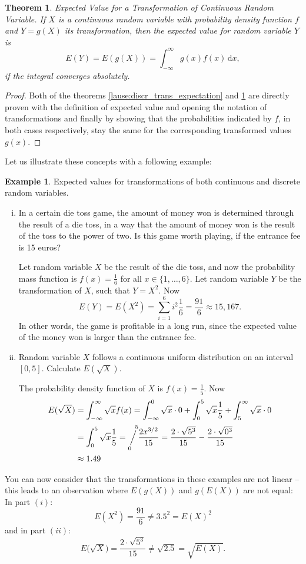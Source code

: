 \documentclass[12pt,a4paper,leqno]{report}
\newcommand{\dif}{\,\mathrm{d}}
\newcommand{\sijoitus}[2]{\mathop{\Big/}\limits_{\hspace{-0.85em}{#1}}^{\hspace{0.85em}{#2}}\hspace{-0.2em}}
\theoremstyle{plain}
\newtheorem{lause}[equation]{Theorem}
\theoremstyle{definition}
\newtheorem{esim}[equation]{Example}
\begin{document}
\begin{lause}\label{lause:cont_trans_expectation} 
Expected Value for a Transformation of Continuous Random Variable. If $X$ is a continuous random variable with probability density function $f$ and $Y = g(X)$ its transformation, then the expected value for random variable $Y$ is
\[
E(Y) = E(g(X)) = \int_{-\infty}^{\infty}g(x)f(x)\dif x,
\]
if the integral converges absolutely.
\end{lause}
\begin{proof}
Both of the theorems \ref{lause:discr_trans_expectation} and \ref{lause:cont_trans_expectation} are directly proven with the definition of expected value and opening the notation of transformations and finally by showing that the probabilities indicated by $f$, in both cases respectively, stay the same for the corresponding transformed values $g(x)$.
\end{proof}

Let us illustrate these concepts with a following example:

\begin{esim} \label{esim:trans_ev}
Expected values for transformations of both continuous and discrete random variables.
\begin{enumerate}[(i)]
\item In a certain die toss game, the amount of money won is determined through the result of a die toss, in a way that the amount of money won is the result of the toss to the power of two. Is this game worth playing, if the entrance fee is 15 euros?

Let random variable $X$ be the result of the die toss, and now the probability mass function is $f(x) = \frac{1}{6}$ for all $x \in \{1, \ldots, 6\}$. Let random variable $Y$ be the transformation of $X$, such that $Y = X^2$. Now
\[
E(Y) = E(X^2) = \sum_{i=1}^6 i^2 \frac{1}{6} = \frac{91}{6} \approx 15,167.
\]
In other words, the game is profitable in a long run, since the expected value of the money won is larger than the entrance fee.
\item Random variable $X$ follows a continuous uniform distribution on an interval $[0,5]$. Calculate $E(\sqrt{X})$.

The probability density function of $X$ is $f(x) = \frac{1}{5}$. Now
\[
\begin{split}
E(\sqrt{X}) &= \int_{-\infty}^{\infty}\sqrt{x}f(x) = \int_{-\infty}^{0}\sqrt{x} \cdot 0 + \int_{0}^{5}\sqrt{x}\frac{1}{5} + \int_{5}^{\infty}\sqrt{x}\cdot 0 \\
&= \int_{0}^{5}\sqrt{x}\frac{1}{5} = \sijoitus{0}{5}\frac{2x^{3/2}}{15} = \frac{2\cdot\sqrt{5^3}}{15} - \frac{2\cdot\sqrt{0^3}}{15} \\
&\approx 1.49
\end{split}
\]
\end{enumerate}
You can now consider that the transformations in these examples are not linear -- this leads to an observation where $E(g(X))$ and $g(E(X))$ are not equal:
In part $(i)$:
\[
E(X^2) = \frac{91}{6} \neq 3.5^2 = E(X)^2
\]
and in part $(ii)$:
\[
E\big(\sqrt{X}\big) = \frac{2\cdot\sqrt{5^3}}{15} \neq \sqrt{2.5} = \sqrt{E(X)}.
\]
\end{esim}
\end{document}

